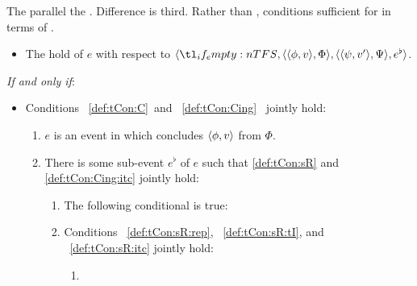 \begin{note}
  The  parallel the .
  Difference is third.
  Rather than \requ{}, conditions sufficient for \requ{} in terms of \tCV{}.

  \begin{definition}
    \label{def:tCon}
    \vspace{-\baselineskip}
    \begin{itemize}
    \item
      The \emph{} hold of \(e\) with respect to \(\langle \vAgent{}, \pvp{\phi}{v}{\Phi}, \pvp{\psi}{v'}{\Psi}, e^{\flat} \rangle\).
    \end{itemize}

    \emph{If and only if}:

    \begin{itemize}
    \item
      Conditions~%
      \ref{def:tCon:C}~and~%
      \ref{def:tCon:Cing}~%
      jointly hold:
      \begin{enumerate}[label=\arabic*., ref=(\arabic*)]
      \item
        \label{def:tCon:C}
        \(e\) is an event in which \vAgent{} concludes \(\langle \phi, v \rangle\) from \(\Phi\).
      \item
        \label{def:tCon:Cing}
        There is some sub-event \(e^{\flat}\) of \(e\) such that \ref{def:tCon:sR} and \ref{def:tCon:Cing:itc} jointly hold:
        \begin{enumerate}[label=\alph*., ref=(\arabic{enumi}\alph*)]
        \item
          \label{def:tCon:Cing:itc}
          The following conditional is true:
        \item
          \label{def:tCon:sR}
          Conditions%
          ~\ref{def:tCon:sR:rep},%
          ~\ref{def:tCon:sR:tI}, and%
          ~\ref{def:tCon:sR:itc} %
          jointly hold:
          \begin{enumerate}[label=\roman*., ref=(\arabic{enumi}\alph{enumii}.\roman*)]
          \item

\end{enumerate}
\end{enumerate}
\end{enumerate}
\end{itemize}
\end{definition}
\end{note}
